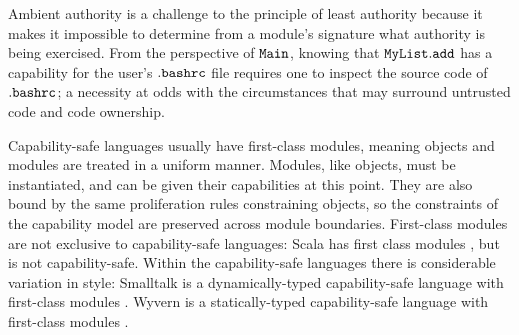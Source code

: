 Ambient authority is a challenge to the principle of least authority because it makes it impossible to determine from a module's signature what authority is being exercised. From the perspective of $\mathtt{Main}$, knowing that $\mathtt{MyList.add}$ has a capability for the user's $\mathtt{.bashrc}$ file requires one to inspect the source code of $\mathtt{.bashrc}$; a necessity at odds with the circumstances that may surround untrusted code and code ownership.

Capability-safe languages usually have first-class modules, meaning objects and modules are treated in a uniform manner. Modules, like objects, must be instantiated, and can be given their capabilities at this point. They are also bound by the same proliferation rules constraining objects, so the constraints of the capability model are preserved across module boundaries. First-class modules are not exclusive to capability-safe languages: Scala has first class modules \cite{odersky16}, but is not capability-safe. Within the capability-safe languages there is considerable variation in style: Smalltalk is a dynamically-typed capability-safe language with first-class modules \cite{bracha10}. Wyvern is a statically-typed capability-safe language \cite{nistor13} with first-class modules \cite{kurilova16}.
